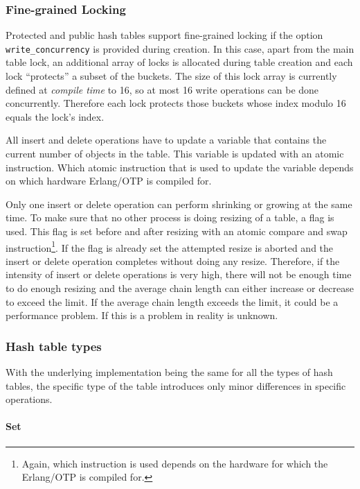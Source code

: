 \documentclass[aps,pre,preprint,nofootinbib]{revtex4}
\begin{document}
\subsubsection{Fine-grained Locking}\label{sec:hash_fine_locking}

Protected and public hash tables support fine-grained locking if the option \verb|write_concurrency| is provided during creation.
In this case, apart from the main table lock, an additional array of locks is allocated during table creation and each lock ``protects'' a subset of the buckets.
The size of this lock array is currently defined at \emph{compile time} to 16, so at most 16 write operations can be done concurrently.
Therefore each lock protects those buckets whose index modulo 16 equals the lock's index.

All insert and delete operations have to update a variable that contains the current number of objects in the table.
This variable is updated with an atomic instruction.
Which atomic instruction that is used to update the variable depends on which hardware Erlang/OTP is compiled for.

Only one insert or delete operation can perform shrinking or growing at the same time.
To make sure that no other process is doing resizing of a table, a flag is used. 
This flag is set before and after resizing with an atomic compare and swap instruction\footnote{Again, which instruction is used depends on the hardware for which the Erlang/OTP is compiled for.}.
If the flag is already set the attempted resize is aborted and the insert or delete operation completes without doing any resize.
Therefore, if the intensity of insert or delete operations is very high, there will not be enough time to do enough resizing and the average chain length can either increase or decrease to exceed the limit.
If the average chain length exceeds the limit, it could be a performance problem.
If this is a problem in reality is unknown.


\subsubsection{Hash table types}

With the underlying implementation being the same for all the types of hash tables, the specific type of the table introduces only minor differences in specific operations.

\paragraph{Set}
\end{document}
